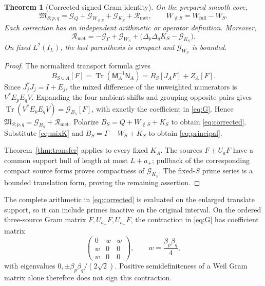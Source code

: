 \documentclass[11pt]{article}
\newtheorem{theorem}{Theorem}[section]
\theoremstyle{remark}
\newcommand{\Mix}{\mathfrak M_{S;p,q}}
\newcommand{\Gform}{\mathcal G}
\newcommand{\Rmet}{\mathcal R_{\mathrm{met}}}
\DeclareMathOperator{\Tr}{Tr}
\numberwithin{equation}{section}
\begin{document}
\begin{theorem}[Corrected signed Gram identity]\label{thm:gram}
On the prepared smooth core,
\begin{equation}\label{eq:corrected}
 \boxed{\Mix=\Gform_Q+\Gform_{W_{\notin S}}
                         +\Gform_{K_S}+\Rmet,}
 \qquad W_{\notin S}=W_{\mathrm{full}}-W_S .
\end{equation}
Each correction has an independent arithmetic or operator definition.
Moreover,
\begin{equation}\label{eq:principal}
 \boxed{\Rmet=-\Gform_\Gamma+\Gform_{W_S}
                      +\bigl(\Delta_p\Delta_qK_S-\Gform_{K_S}\bigr).}
\end{equation}
On fixed \(L^2(I_L)\), the last parenthesis is compact and
\(\Gform_{W_S}\) is bounded.
\end{theorem}
\begin{proof}
The normalized transport formula gives
\[
 B_{S\cup A}[F]=\Tr(\mathsf M_A^{-1}\mathsf N_A)
                    =B_S[J_AF]+Z_A[F].
\]
Since \(J_j^*J_j=I+E_j\), the mixed difference of the unweighted
numerators is \(V^*E_pE_qV\). Expanding the four ambient shifts and
grouping opposite pairs gives
\(\Tr(V^*E_pE_qV)=\Gform_{B_S}[F]\), with exactly the coefficient in
\eqref{eq:G}. Hence \(\Mix=\Gform_{B_S}+\Rmet\).
Polarize \(B_S=Q+W_{\notin S}+K_S\) to obtain
\eqref{eq:corrected}. Substitute \eqref{eq:mixK} and
\(B_S=\Gamma-W_S+K_S\) to obtain \eqref{eq:principal}.

Theorem~\ref{thm:transfer} applies to every fixed \(K_A\).
The sources \(F\pm U_aF\) have a common support hull of length at most
\(L+a_+\); pullback of the corresponding compact source forms proves
compactness of \(\Gform_{K_S}\). The fixed-\(S\) prime series is a bounded
translation form, proving the remaining assertion.
\end{proof}

The complete arithmetic in \eqref{eq:corrected} is evaluated on the
enlarged translate support, so it can include primes inactive on the
original interval. On the ordered three-source Gram matrix
\(F,U_{a_+}F,U_{a_-}F\), the contraction in \eqref{eq:G} has coefficient
matrix
\[
 \begin{pmatrix}0&w&w\\w&0&0\\w&0&0\end{pmatrix},
 \qquad w=\frac{\beta_p\beta_q}{4},
\]
with eigenvalues \(0,\pm\beta_p\beta_q/(2\sqrt2)\). Positive semidefiniteness
of a Weil Gram matrix alone therefore does not sign this contraction.
\end{document}

